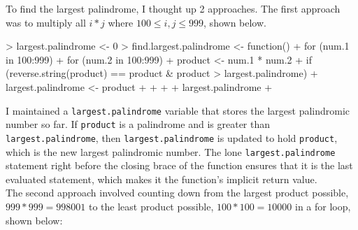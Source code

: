 \documentclass{article}
\begin{document}
\begin{enumerate}
To find the largest palindrome, I thought up 2 approaches. The first approach was to multiply all $i*j$ where $100 \leq i,j \leq 999$, shown below. 
\begin{Schunk}
\begin{Sinput}
> largest.palindrome <- 0
> find.largest.palindrome <- function() {
+   for (num.1 in 100:999) {
+     for (num.2 in 100:999) {
+       product <- num.1 * num.2
+       if (reverse.string(product) == product & product > largest.palindrome) {
+         largest.palindrome <- product
+       }
+     }
+   }
+   largest.palindrome
+ }
\end{Sinput}
\end{Schunk}
I maintained a \texttt{largest.palindrome} variable that stores the largest palindromic number so far. If \texttt{product} is a palindrome and is greater than \texttt{largest.palindrome}, then \texttt{largest.palindrome} is updated to hold \texttt{product}, which is the new largest palindromic number. The lone \texttt{largest.palindrome} statement right before the closing brace of the function ensures that it is the last evaluated statement, which makes it the function's implicit return value. \\

The second approach involved counting down from the largest product possible, $999*999=998001$ to the least product possible, $100*100=10000$ in a for loop, shown below: 


\end{enumerate}
\end{document}
